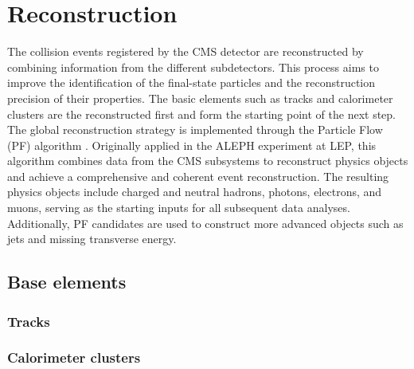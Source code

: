 \chapter{Reconstruction}

The collision events registered by the CMS detector are reconstructed by combining information from the different subdetectors.
This process aims to improve the identification of the final-state particles and the reconstruction precision of their properties.
The basic elements such as tracks and calorimeter clusters are the reconstructed first and form the starting point of the next step.
The global reconstruction strategy is implemented through the Particle Flow (PF) algorithm \cite{ParticleFlow}.
Originally applied in the ALEPH experiment at LEP, this algorithm combines data from the CMS subsystems to reconstruct physics objects and achieve a comprehensive and coherent event reconstruction.
The resulting physics objects include charged and neutral hadrons, photons, electrons, and muons, serving as the starting inputs for all subsequent data analyses.
Additionally, PF candidates are used to construct more advanced objects such as jets and missing transverse energy.



\section{Base elements}
\subsection{Tracks}
\label{sec:tracks}


\subsection{Calorimeter clusters}


